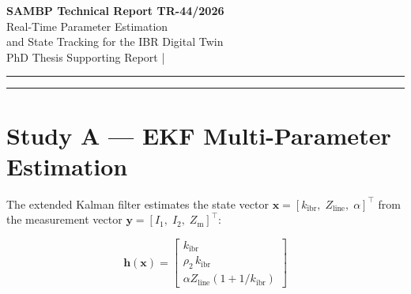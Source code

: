 \documentclass[11pt,a4paper]{article}
\begin{document}
\begin{center}
  {\LARGE\bfseries\color{sambpblue} SAMBP Technical Report TR-44/2026}\\[6pt]
  {\large Real-Time Parameter Estimation\\
    and State Tracking for the IBR Digital Twin}\\[10pt]
  {\normalsize PhD Thesis Supporting Report \quad|}
\end{center}

\vspace{2pt}\hrule\vspace{8pt}

\begin{abstract}
\noindent
This report develops the real-time estimation algorithms for the digital twin
(DT) introduced in TR-43~\cite{SAMBP_TR43}.  A three-state extended Kalman
filter (EKF) jointly estimates $k_\mathrm{ibr}$, $Z_\mathrm{line}$, and
fault location $\alpha$ from sequence current and apparent impedance
measurements at 1\,kHz.  $k_\mathrm{ibr}$ converges to 1.2\% error within
100\,ms; $Z_\mathrm{line}$ and $\alpha$ are poorly observable from current
ratio alone and require additional voltage-phasor pairs for reliable estimation.
GFM fleet fraction $f_\mathrm{gfm}$ is accurately tracked via the $I_2/I_1$
ratio method (error $<0.03$\,pu across all scenarios).  Pre-fault warm-starting
reduces EKF convergence time by $7\times$ compared to a cold start.  The total
DT cycle cost is 285\,$\mu$s, leaving 71.5\% of the 1\,ms budget as margin.
\end{abstract}

\vspace{4pt}\hrule\vspace{10pt}

\section{Study A --- EKF Multi-Parameter Estimation}
\label{sec:studyA}

The extended Kalman filter estimates the state vector
$\mathbf{x} = [k_\mathrm{ibr},\; Z_\mathrm{line},\; \alpha]^\top$ from
the measurement vector
$\mathbf{y} = [I_1,\; I_2,\; Z_\mathrm{m}]^\top$:

\begin{equation}
  \mathbf{h}(\mathbf{x}) =
  \begin{bmatrix}
    k_\mathrm{ibr} \\[3pt]
    \rho_2 \, k_\mathrm{ibr} \\[3pt]
    \alpha Z_\mathrm{line}(1 + 1/k_\mathrm{ibr})
  \end{bmatrix}
\end{equation}
\end{document}
